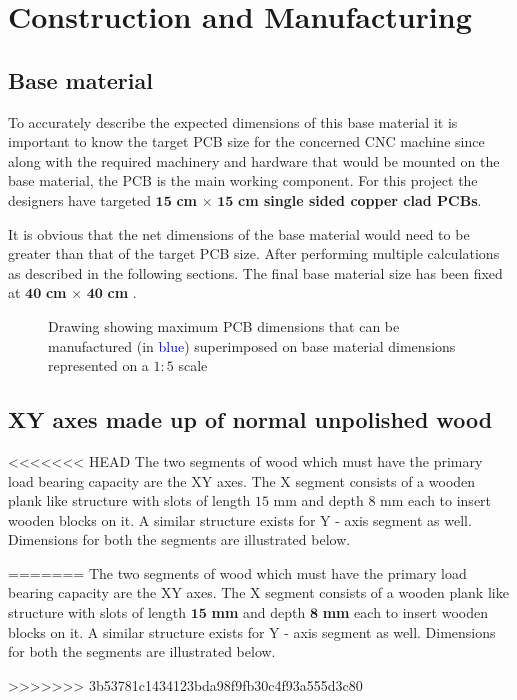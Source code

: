 \chapter{Construction and Manufacturing} \label{chapter3}

\section{Base material} \label{bmaterial}

To accurately describe the expected dimensions of this base material it is important to know the target PCB size for the concerned CNC machine since along with the required machinery and hardware that would be mounted on the base material, the PCB is the main working component. For this project the designers have targeted $\boldsymbol{15}$ \textbf{cm} $\boldsymbol{\times}$ $\boldsymbol{15}$ \textbf{cm single sided copper clad PCBs}. \par

It is obvious that the net dimensions of the base material would need to be greater than that of the target PCB size. After performing multiple calculations as described in the following sections. The final base material size has been fixed at $\boldsymbol{40}$ \textbf{cm} $\boldsymbol{\times}$ $\boldsymbol{40}$ \textbf{cm} .

\begin{figure}[h]
 \centering
 \caption{Drawing showing maximum PCB dimensions that can be manufactured (in \textcolor{blue}{blue}) superimposed on base material dimensions represented on a $1:5$ scale}
 \label{fig:base}
\end{figure}


\section{XY axes made up of normal unpolished wood}

<<<<<<< HEAD
The two segments of wood which must have the primary load bearing capacity are the XY axes. The X segment consists of a wooden plank like structure with slots of length $15$ mm and depth $8$ mm each to insert wooden blocks on it. A similar structure exists for Y - axis segment as well. Dimensions for both the segments are illustrated below. \par
=======
The two segments of wood which must have the primary load bearing capacity are the XY axes. The X segment consists of a wooden plank like structure with slots of length $\boldsymbol{15}$ \textbf{mm} and depth $\boldsymbol{8}$  \textbf{mm} each to insert wooden blocks on it. A similar structure exists for Y - axis segment as well. Dimensions for both the segments are illustrated below. \par 
>>>>>>> 3b53781c1434123bda98f9fb30c4f93a555d3c80

